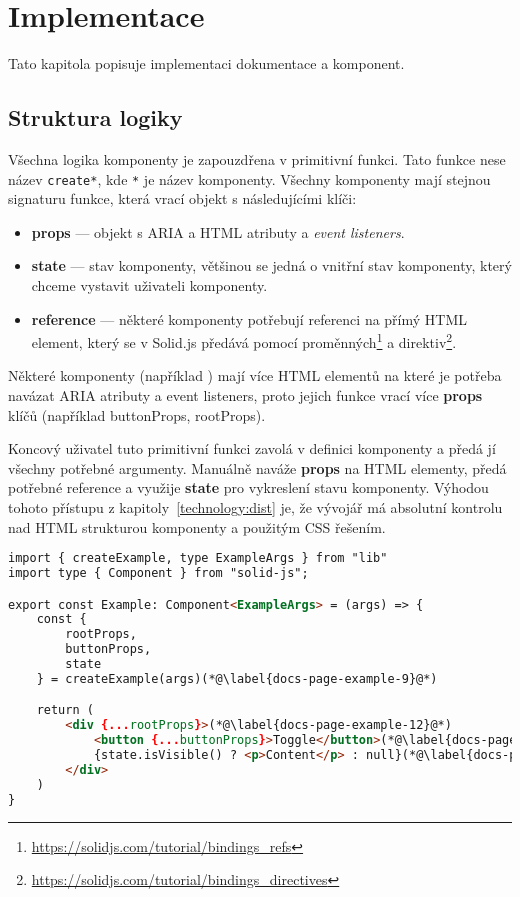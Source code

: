 \chapter{Implementace}

Tato kapitola popisuje implementaci dokumentace a komponent.

\section{Struktura logiky}

Všechna logika komponenty je zapouzdřena v primitivní funkci.
Tato funkce nese název \texttt{create*}, kde \texttt{*} je název komponenty.
Všechny komponenty mají stejnou signaturu funkce, která vrací objekt s následujícími klíči:

\begin{itemize}
    \item \textbf{props} --- objekt s ARIA a HTML atributy a \textit{event listeners}.
    \item \textbf{state} --- stav komponenty, většinou se jedná o vnitřní stav komponenty, který chceme vystavit uživateli komponenty.
    \item \textbf{reference} --- některé komponenty potřebují referenci na přímý HTML element, který se v Solid.js předává pomocí proměnných\footnote{\url{https://solidjs.com/tutorial/bindings_refs}} a direktiv\footnote{\url{https://solidjs.com/tutorial/bindings_directives}}.
\end{itemize}

Některé komponenty (například ) mají více HTML elementů na které je potřeba navázat ARIA atributy a event listeners, proto jejich funkce vrací více \textbf{props} klíčů (například buttonProps, rootProps).

Koncový uživatel tuto primitivní funkci zavolá v definici komponenty a předá jí všechny potřebné argumenty.
Manuálně naváže \textbf{props} na HTML elementy, předá potřebné reference a využije \textbf{state} pro vykreslení stavu komponenty.
Výhodou tohoto přístupu z kapitoly~\ref{technology:dist} je, že vývojář má absolutní kontrolu nad HTML strukturou komponenty a použitým CSS řešením.

\clearpage

\begin{lstlisting}[caption={Příklad implementace komponenty pomocí primitivní funkce}, label={implementation-example}, language=html]
import { createExample, type ExampleArgs } from "lib"
import type { Component } from "solid-js";

export const Example: Component<ExampleArgs> = (args) => {
    const {
        rootProps,
        buttonProps,
        state
    } = createExample(args)(*@\label{docs-page-example-9}@*)

    return (
        <div {...rootProps}>(*@\label{docs-page-example-12}@*)
            <button {...buttonProps}>Toggle</button>(*@\label{docs-page-example-13}@*)
            {state.isVisible() ? <p>Content</p> : null}(*@\label{docs-page-example-14}@*)
        </div>
    )
}
\end{lstlisting}

